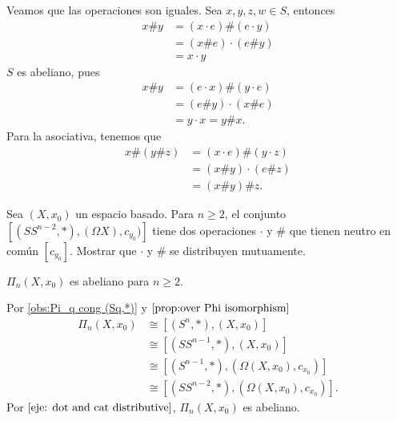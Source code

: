 \begin{dem}
    Veamos que las operaciones son iguales. Sea $x,y,z,w\in S$, entonces 
    \begin{align*}
        x\#y&=(x\cdot e)\#(e\cdot y)\\
        &=(x\# e)\cdot(e\# y)\\
        &=x\cdot y
    \end{align*}
    $S$ es abeliano, pues
    \begin{align*}
        x\#y&=(e\cdot x)\#(y\cdot e)\\
        &=(e\# y)\cdot(x\#e)\\
        &=y\cdot x=y\# x.
    \end{align*}
    Para la asociativa, tenemos que
    \begin{align*}
        x\#(y\#z)&=(x\cdot e)\#(y\cdot z)\\
        &=(x\# y)\cdot(e\#z)\\
        &=(x\# y)\# z.
    \end{align*}
\end{dem}
\begin{ejercicio}
\label{eje: dot and cat distributive}
    Sea $(X,x_0)$ un espacio basado. Para $n\geq 2$, el conjunto $[(SS^{n-2},*),(\Omega X),c_{y_0})]$ tiene dos operaciones $\cdot$ y $\#$ que tienen neutro en común $[c_{y_0}]$. Mostrar que $\cdot$ y $\#$ se distribuyen mutuamente.
\end{ejercicio}
\begin{coro}
    $\Pi_n(X,x_0)$ es abeliano para $n\geq 2$.
\end{coro}
\begin{dem}
    Por \ref{obs:Pi_q cong (Sq,*)} y $\ref{prop:over Phi isomorphism}$
    \begin{align*}
        \Pi_n(X,x_0)&\cong[(S^n,*),(X,x_0)]\\
        &\cong [(SS^{n-1},*),(X,x_0)]\\
        &\cong[(S^{n-1},*),(\Omega(X,x_0),c_{x_0})]\\
        &\cong[(SS^{n-2},*),(\Omega(X,x_0),c_{x_0})].
    \end{align*}
    Por $\ref{eje: dot and cat distributive}$, $\Pi_n(X,x_0)$ es abeliano.
\end{dem}


